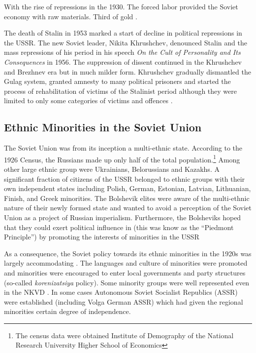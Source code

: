 With the rise of repressions in the 1930.
The forced labor provided the Soviet economy with raw materials. Third of gold \citep{applebaum_gulag:_2004}. 

The death of Stalin in 1953 marked a start of decline in political repressions in the USSR. The new Soviet leader, Nikita Khrushchev, denounced Stalin and the mass repressions of his period in his speech \emph{On the Cult of Personality and Its Consequences} in 1956. The suppression of dissent continued in the Khrushchev and  Brezhnev era but in much milder form. Khrushchev gradually dismantled the Gulag system, granted amnesty to many political prisoners and started the process of rehabilitation of victims of the Stalinist period although they were limited to only some categories of victims and offences \citep{applebaum_gulag:_2004, dobson_khrushchevs_2009}. 

\subsection{Ethnic Minorities in the Soviet Union}
The Soviet Union was from its inception a multi-ethnic state. 
According to the 1926 Census, the Russians made up only half of the total population.\footnote{The census data were obtained  Institute of Demography of the National Research University Higher School of Economics} Among other large ethnic group were Ukrainians, Belorussians and Kazakhs.  A significant fraction of citizens of the USSR belonged to ethnic groups with their own independent states including Polish, German, Estonian, Latvian, Lithuanian, Finish,  and Greek minorities. 
The Bolshevik elites were aware of the multi-ethnic nature of their newly formed state and wanted to  avoid a perception of the Soviet Union as a project of Russian imperialism. Furthermore, the Bolsheviks hoped that
they could exert political influence in (this was know as the \enquote{Piedmont Principle})
by promoting the interests of minorities in the USSR

As a consequence, the Soviet policy towards its ethnic minorities in the 1920s was largely accommodating \citep{martin_affirmative_2001}. The languages and culture of minorities were promoted and minorities were encouraged to enter local governments and party structures (so-called \emph{korenizatsiya} policy). Some minority groups were well represented even in the NKVD \citep[p. 25]{gregory_terror_2009}.
In some cases Autonomous Soviet Socialist Republics (ASSR) were established (including Volga German ASSR) which had given the regional minorities certain degree of independence. 

